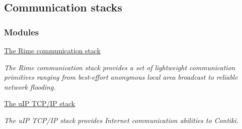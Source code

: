 \hypertarget{a00050}{\subsection{\-Communication stacks}
\label{a00050}
}
\subsubsection*{\-Modules}
\begin{DoxyCompactItemize}
\item 
\hyperlink{a00054}{\-The Rime communication stack}
\begin{DoxyCompactList}\small\item\em \-The \-Rime communication stack provides a set of lightweight communication primitives ranging from best-\/effort anonymous local area broadcast to reliable network flooding. \end{DoxyCompactList}\item 
\hyperlink{a00060}{\-The u\-I\-P T\-C\-P/\-I\-P stack}
\begin{DoxyCompactList}\small\item\em \-The u\-I\-P \-T\-C\-P/\-I\-P stack provides \-Internet communication abilities to \-Contiki. \end{DoxyCompactList}\end{DoxyCompactItemize}
